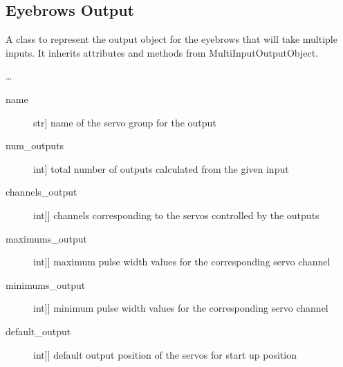 \documentclass[letterpaper,10pt,english]{sphinxmanual}
\begin{document}
\subsection{Eyebrows Output}
\label{\detokenize{specific:module-EyebrowsOutput}}\label{\detokenize{specific:eyebrows-output}}

\begin{fulllineitems}
\label{\detokenize{specific:EyebrowsOutput.EyebrowsOutput}}
\sphinxAtStartPar
A class to represent the output object for the eyebrows that will take multiple inputs.
It inherits attributes and methods from MultiInputOutputObject.

\sphinxAtStartPar
…

\sphinxAtStartPar
{}
\begin{description}
\item[{name}] \leavevmode{[}str{]}
\sphinxAtStartPar
name of the servo group for the output

\item[{num\_outputs}] \leavevmode{[}int{]}
\sphinxAtStartPar
total number of outputs calculated from the given input

\item[{channels\_output}] \leavevmode{[}{[}int{]}{]}
\sphinxAtStartPar
channels corresponding to the servos controlled by the outputs

\item[{maximums\_output}] \leavevmode{[}{[}int{]}{]}
\sphinxAtStartPar
maximum pulse width values for the corresponding servo channel

\item[{minimums\_output}] \leavevmode{[}{[}int{]}{]}
\sphinxAtStartPar
minimum pulse width values for the corresponding servo channel

\item[{default\_output}] \leavevmode{[}{[}int{]}{]}
\sphinxAtStartPar
default output position of the servos for start up position


\end{description}
\end{fulllineitems}
\end{document}
